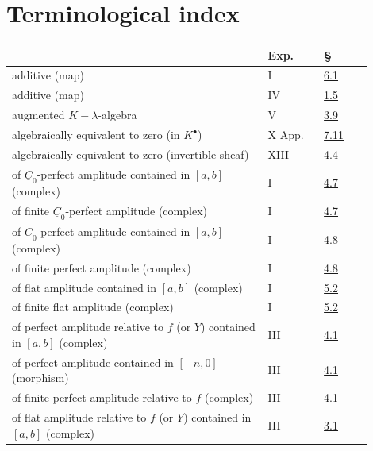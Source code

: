 %

\section*{Terminological index}
\begingroup\small
\begin{longtable}{@{}>{\raggedright\arraybackslash}p{0.64\linewidth}>{\raggedright\arraybackslash}p{0.14\linewidth}>{\raggedright\arraybackslash}p{0.12\linewidth}@{}}
\toprule
 & Exp. & §\\
\midrule
additive (map) & I & \hyperlink{sga6.e01.def.6-1}{6.1}\\
additive (map) & IV & \hyperlink{sga6.e04.para.1-5}{1.5}\\
augmented \(K-\lambda\)-algebra & V & \hyperlink{sga6.e05.def.3-9}{3.9}\\
algebraically equivalent to zero (in \(K^{\bullet}\)) & X App. & \hyperlink{sga6.e10.para.7-11}{7.11}\\
algebraically equivalent to zero (invertible sheaf) & XIII & \hyperlink{sga6.e13.para.4-4}{4.4}\\
of \(\underline{C}_0\)-perfect amplitude contained in \([a,b]\) (complex) & I & \hyperlink{sga6.e01.def.4-7}{4.7}\\
of finite \(\underline{C}_0\)-perfect amplitude (complex) & I & \hyperlink{sga6.e01.def.4-7}{4.7}\\
of \(\underline{C}_0\) perfect amplitude contained in \([a,b]\) (complex) & I & \hyperlink{sga6.e01.ex.4-8}{4.8}\\
of finite perfect amplitude (complex) & I & \hyperlink{sga6.e01.ex.4-8}{4.8}\\
of flat amplitude contained in \([a,b]\) (complex) & I & \hyperlink{sga6.e01.def.5-2}{5.2}\\
of finite flat amplitude (complex) & I & \hyperlink{sga6.e01.def.5-2}{5.2}\\
of perfect amplitude relative to \(f\) (or \(Y\)) contained in \([a,b]\) (complex) & III & \hyperlink{sga6.e03.def.4-1}{4.1}\\
of perfect amplitude contained in \([-n,0]\) (morphism) & III & \hyperlink{sga6.e03.def.4-1}{4.1}\\
of finite perfect amplitude relative to \(f\) (complex) & III & \hyperlink{sga6.e03.def.4-1}{4.1}\\
of flat amplitude relative to \(f\) (or \(Y\)) contained in \([a,b]\) (complex) & III & \hyperlink{sga6.e03.def.3-1}{3.1}\\

\end{longtable}
